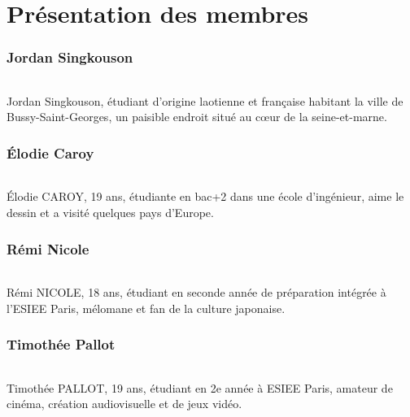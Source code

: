 \part{Présentation des membres}
\thispagestyle{plain}

\section*{Jordan Singkouson}

\paragraph{} Jordan Singkouson, étudiant d'origine laotienne et française
habitant la ville de Bussy-Saint-Georges, un paisible endroit situé au cœur de
la seine-et-marne. 

\section*{Élodie Caroy}

\paragraph{} Élodie CAROY, 19 ans, étudiante en bac+2 dans une école
d'ingénieur, aime le dessin et a visité quelques pays d'Europe.

\section*{Rémi Nicole}

\paragraph{} Rémi NICOLE, 18 ans, étudiant en seconde année de préparation
intégrée à l'ESIEE Paris, mélomane et fan de la culture japonaise.

\section*{Timothée Pallot}

\paragraph{} Timothée PALLOT, 19 ans, étudiant en 2e année à ESIEE Paris,
amateur de cinéma, création audiovisuelle et de jeux vidéo.
